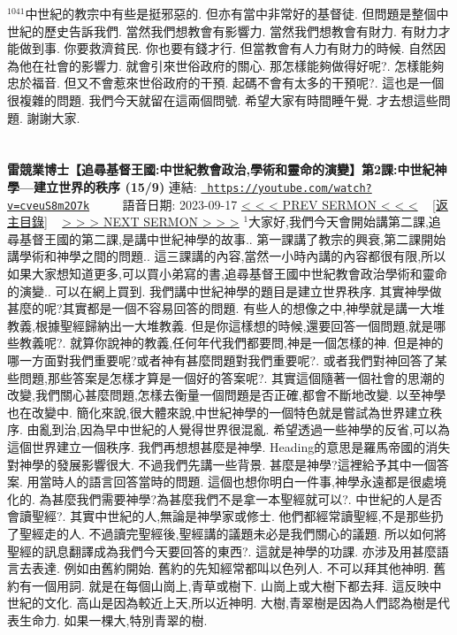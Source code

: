 \documentclass{book}
\begin{document}
$^{1041}$中世紀的教宗中有些是挺邪惡的.
但亦有當中非常好的基督徒.
但問題是整個中世紀的歷史告訴我們.
當然我們想教會有影響力.
當然我們想教會有財力.
有財力才能做到事.
你要救濟貧民.
你也要有錢才行.
但當教會有人力有財力的時候.
自然因為他在社會的影響力.
就會引來世俗政府的關心.
那怎樣能夠做得好呢?.
怎樣能夠忠於福音.
但又不會惹來世俗政府的干預.
起碼不會有太多的干預呢?.
這也是一個很複雜的問題.
我們今天就留在這兩個問號.
希望大家有時間睡午覺.
才去想這些問題.
謝謝大家.
\newpage



\section{}
\label{sec:cveuS8m2O7k}
\textbf{雷競業博士【追尋基督王國:中世紀教會政治,學術和靈命的演變】第2課:中世紀神學—建立世界的秩序 (15/9)}
\newline
\newline
連結: \href{https://youtube.com/watch?v=cveuS8m2O7k}{\texttt{ https://youtube.com/watch?v=cveuS8m2O7k}} ~~~~ 語音日期: 2023-09-17 
\newline
\newline
\hyperref[sec:zhKDWS7eHdY]{\small{< < < PREV SERMON < < <}}
~
\hyperref[sec:index]{\small{[返主目錄]}}
~
\hyperref[sec:sTByjA4YMcM]{\small{> > > NEXT SERMON > > >}}
\newline
\newline
$^{1}$大家好,我們今天會開始講第二課,追尋基督王國的第二課,是講中世紀神學的故事..
第一課講了教宗的興衰,第二課開始講學術和神學之間的問題..
這三課講的內容,當然一小時內講的內容都很有限,所以如果大家想知道更多,可以買小弟寫的書,追尋基督王國中世紀教會政治學術和靈命的演變..
可以在網上買到.
我們講中世紀神學的題目是建立世界秩序.
其實神學做甚麼的呢?其實都是一個不容易回答的問題.
有些人的想像之中,神學就是講一大堆教義,根據聖經歸納出一大堆教義.
但是你這樣想的時候,還要回答一個問題,就是哪些教義呢?.
就算你說神的教義,任何年代我們都要問,神是一個怎樣的神.
但是神的哪一方面對我們重要呢?或者神有甚麼問題對我們重要呢?.
或者我們對神回答了某些問題,那些答案是怎樣才算是一個好的答案呢?.
其實這個隨著一個社會的思潮的改變,我們關心甚麼問題,怎樣去衡量一個問題是否正確,都會不斷地改變.
以至神學也在改變中.
簡化來說,很大體來說,中世紀神學的一個特色就是嘗試為世界建立秩序.
由亂到治,因為早中世紀的人覺得世界很混亂.
希望透過一些神學的反省,可以為這個世界建立一個秩序.
我們再想想甚麼是神學.
Heading的意思是羅馬帝國的消失對神學的發展影響很大.
不過我們先講一些背景.
甚麼是神學?這裡給予其中一個答案.
用當時人的語言回答當時的問題.
這個也想你明白一件事,神學永遠都是很處境化的.
為甚麼我們需要神學?為甚麼我們不是拿一本聖經就可以?.
中世紀的人是否會讀聖經?.
其實中世紀的人,無論是神學家或修士.
他們都經常讀聖經,不是那些扔了聖經走的人.
不過讀完聖經後,聖經講的議題未必是我們關心的議題.
所以如何將聖經的訊息翻譯成為我們今天要回答的東西?.
這就是神學的功課.
亦涉及用甚麼語言去表達.
例如由舊約開始.
舊約的先知經常都叫以色列人.
不可以拜其他神明.
舊約有一個用詞.
就是在每個山崗上,青草或樹下.
山崗上或大樹下都去拜.
這反映中世紀的文化.
高山是因為較近上天,所以近神明.
大樹,青翠樹是因為人們認為樹是代表生命力.
如果一棵大,特別青翠的樹.
\end{document}
